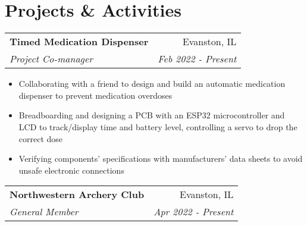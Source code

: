 \documentclass[letterpaper,20pt]{article}
\makeatletter
\newcommand{\resumeItemWithoutTitle}[1]{

  \item{
  }
  \vspace{-5pt}
}
\newcommand{\resumeSubheading}[4]{
  
  \vspace{2pt}
    \begin{tabular*}{0.97\textwidth}{l@{\extracolsep{\fill}}r}
      \textbf{#1} & #2 \\
      \textit{#3} & \textit{#4} \\
    \end{tabular*}\vspace{5pt}
}
\newcommand{\resumeItemListStart}{\begin{itemize}\vspace{-5pt}}
\newcommand{\resumeItemListEnd}{\end{itemize}}
\makeatother
\begin{document}
\vspace{-5pt}
\section{Projects \& Activities}

    \resumeSubheading{Timed Medication Dispenser}{Evanston, IL}
    {Project Co-manager}{Feb 2022 - Present}
    \resumeItemListStart
        \resumeItemWithoutTitle{}
          {Collaborating with a friend to design and build an automatic medication dispenser to prevent medication overdoses}
    \resumeItemWithoutTitle{}
          {Breadboarding and designing a PCB with an ESP32 microcontroller and LCD to track/display time and battery level, controlling a servo to drop the correct dose}
    \resumeItemWithoutTitle{}
          {Verifying components' specifications with manufacturers' data sheets to avoid unsafe electronic connections}
          \resumeItemListEnd
        
    \resumeSubheading{Northwestern Archery Club}{Evanston, IL}
    {General Member}{Apr 2022 - Present}




\vspace{-5pt}
\end{document}
